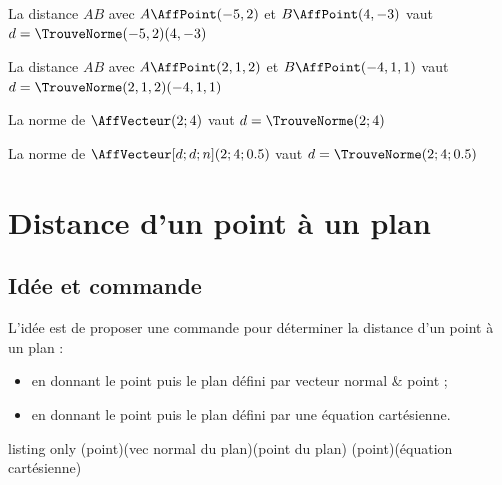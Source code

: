 \documentclass[a4paper,french,11pt]{article}
\newcommand\cmaj[1]{%
	{\tcbox[vignetteMaJ]{#1}\xspace}%
}
\begin{document}
\begin{PresCodePL}{}
La distance $AB$ avec $A\AffPoint(-5,2)$ et $B\AffPoint(4,-3)$ vaut
$d =\displaystyle\TrouveNorme(-5,2)(4,-3)$
\end{PresCodePL}

\begin{PresCodePL}{}
La distance $AB$ avec $A\AffPoint(2,1,2)$ et $B\AffPoint(-4,1,1)$ vaut
$d =\displaystyle\TrouveNorme(2,1,2)(-4,1,1)$
\end{PresCodePL}

\begin{PresCodePL}{}
La norme de $\AffVecteur(2;4)$ vaut
$d =\displaystyle\TrouveNorme(2;4)$
\end{PresCodePL}

\begin{PresCodePL}{}
La norme de $\AffVecteur[d;d;n](2;4;0.5)$ vaut
$d =\displaystyle\TrouveNorme(2;4;0.5)$
\end{PresCodePL}

\newpage

\section{Distance d'un point à un plan}\label{distptplan}

\subsection{Idée et commande}

\begin{tipblock}
\cmaj{2.6.4} L'idée est de proposer une commande pour déterminer la distance d'un point à un plan :

\begin{itemize}
	\item en donnant le point puis le plan défini par vecteur normal \&{} point ;
	\item en donnant le point puis le plan défini par une équation cartésienne.
\end{itemize}
\vspace*{-\baselineskip}\leavevmode
\end{tipblock}

\begin{PresCodeTexPL}{listing only}
\TrouveDistancePtPlan(point)(vec normal du plan)(point du plan)
\TrouveDistancePtPlan(point)(équation cartésienne)
\end{PresCodeTexPL}
\end{document}
